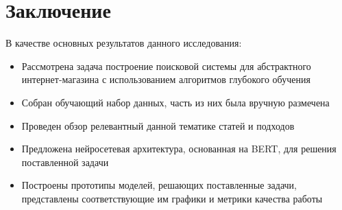 \documentclass[12pt,a4paper]{article}
\begin{document}
\begin{table}[H]
\begin{center}
\caption{Предложение следующего слова при вводе пользователем запроса.}
\end{center}
\end{table}

\section{Заключение}
В качестве основных результатов данного исследования:
\begin{itemize}
    \item Рассмотрена задача построение поисковой системы для абстрактного интернет-магазина с использованием алгоритмов глубокого обучения
    \item Собран обучающий набор данных, часть из них была вручную размечена
    \item Проведен обзор релевантный данной тематике статей и подходов
    \item Предложена нейросетевая архитектура, основанная на BERT, для решения поставленной задачи
    \item Построены прототипы моделей, решающих поставленные задачи, представлены соответствующие им графики и метрики качества работы
\end{itemize}
\end{document}
